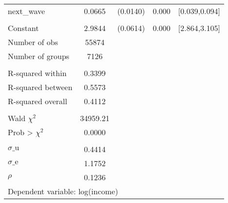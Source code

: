 {\begin{tabular}{l*{1}{cccc}}
next\_wave           &      0.0665&    (0.0140)&       0.000&[0.039,0.094]\\
                    &            &            &            &            \\
Constant            &      2.9844&    (0.0614)&       0.000&[2.864,3.105]\\
\midrule
Number of obs       &       55874&            &            &            \\
Number of groups    &        7126&            &            &            \\
\\ R-squared within &      0.3399&            &            &            \\
R-squared between   &      0.5573&            &            &            \\
R-squared overall   &      0.4112&            &            &            \\
\\ Wald $\chi^2$    &    34959.21&            &            &            \\
Prob > $\chi^2$     &      0.0000&            &            &            \\
\\ $\sigma\text{\_u}$&      0.4414&            &            &            \\
$\sigma\text{\_e}$   &      1.1752&            &            &            \\
$\rho$              &      0.1236&            &            &            \\
\bottomrule
\multicolumn{5}{l}{\footnotesize Dependent variable: log(income)}\\
\end{tabular}
}
